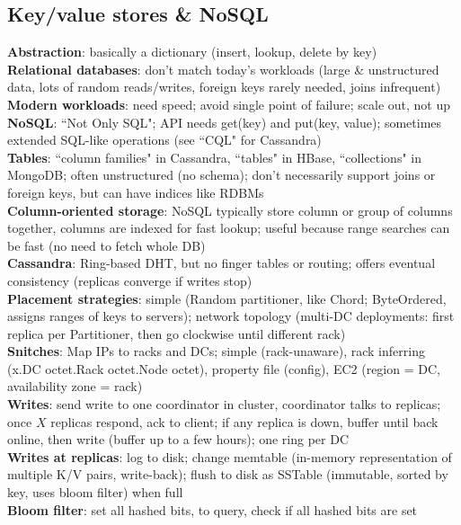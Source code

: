 \documentclass{article}
\begin{document}
\begin{multicols*}{3}
\section{Key/value stores \& NoSQL}
\textbf{Abstraction}: basically a dictionary (insert, lookup, delete by key) \\
\textbf{Relational databases}: don't match today's workloads (large \& unstructured data, lots of random reads/writes, foreign keys rarely needed, joins infrequent) \\
\textbf{Modern workloads}: need speed; avoid single point of failure; scale out, not up \\
\textbf{NoSQL}: ``Not Only SQL"; API needs get(key) and put(key, value); sometimes extended SQL-like operations (see ``CQL" for Cassandra) \\
\textbf{Tables}: ``column families" in Cassandra, ``tables" in HBase, ``collections" in MongoDB; often unstructured (no schema); don't necessarily support joins or foreign keys, but can have indices like RDBMs \\
\textbf{Column-oriented storage}: NoSQL typically store column or group of columns together, columns are indexed for fast lookup; useful because range searches can be fast (no need to fetch whole DB) \\
\textbf{Cassandra}: Ring-based DHT, but no finger tables or routing; offers eventual consistency (replicas converge if writes stop) \\
\textbf{Placement strategies}: simple (Random partitioner, like Chord; ByteOrdered, assigns ranges of keys to servers); network topology (multi-DC deployments: first replica per Partitioner, then go clockwise until different rack) \\
\textbf{Snitches}: Map IPs to racks and DCs; simple (rack-unaware), rack inferring (x.DC octet.Rack octet.Node octet), property file (config), EC2 (region = DC, availability zone = rack) \\
\textbf{Writes}: send write to one coordinator in cluster, coordinator talks to replicas; once $X$ replicas respond, ack to client; if any replica is down, buffer until back online, then write (buffer up to a few hours); one ring per DC \\
\textbf{Writes at replicas}: log to disk; change memtable (in-memory representation of multiple K/V pairs, write-back); flush to disk as SSTable (immutable, sorted by key, uses bloom filter) when full \\
\textbf{Bloom filter}: set all hashed bits, to query, check if all hashed bits are set \\

\end{multicols*}
\end{document}
